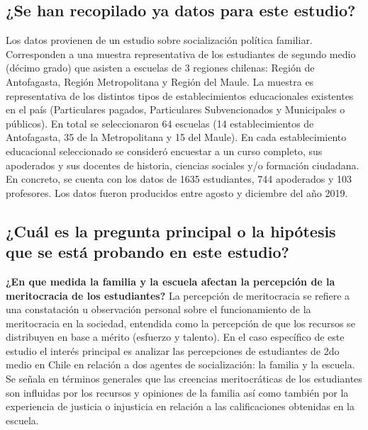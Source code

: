 \documentclass[
  12pt,
]{article}
\begin{document}
\pagebreak

\hypertarget{se-han-recopilado-ya-datos-para-este-estudio}{%
\subsection{¿Se han recopilado ya datos para este
estudio?}\label{se-han-recopilado-ya-datos-para-este-estudio}}

Los datos provienen de un estudio sobre socialización política familiar.
Corresponden a una muestra representativa de los estudiantes de segundo
medio (décimo grado) que asisten a escuelas de 3 regiones chilenas:
Región de Antofagasta, Región Metropolitana y Región del Maule. La
muestra es representativa de los distintos tipos de establecimientos
educacionales existentes en el país (Particulares pagados, Particulares
Subvencionados y Municipales o públicos). En total se seleccionaron 64
escuelas (14 establecimientos de Antofagasta, 35 de la Metropolitana y
15 del Maule). En cada establecimiento educacional seleccionado se
consideró encuestar a un curso completo, sus apoderados y sus docentes
de historia, ciencias sociales y/o formación ciudadana. En concreto, se
cuenta con los datos de 1635 estudiantes, 744 apoderados y 103
profesores. Los datos fueron producidos entre agosto y diciembre del año
2019.

\hypertarget{cuuxe1l-es-la-pregunta-principal-o-la-hipuxf3tesis-que-se-estuxe1-probando-en-este-estudio}{%
\subsection{¿Cuál es la pregunta principal o la hipótesis que se está
probando en este
estudio?}\label{cuuxe1l-es-la-pregunta-principal-o-la-hipuxf3tesis-que-se-estuxe1-probando-en-este-estudio}}

\textbf{¿En que medida la familia y la escuela afectan la percepción de
la meritocracia de los estudiantes?} La percepción de meritocracia se
refiere a una constatación u observación personal sobre el
funcionamiento de la meritocracia en la sociedad, entendida como la
percepción de que los recursos se distribuyen en base a mérito (esfuerzo
y talento). En el caso específico de este estudio el interés principal
es analizar las percepciones de estudiantes de 2do medio en Chile en
relación a dos agentes de socialización: la familia y la escuela. Se
señala en términos generales que las creencias meritocráticas de los
estudiantes son influidas por los recursos y opiniones de la familia así
como también por la experiencia de justicia o injusticia en relación a
las calificaciones obtenidas en la escuela.
\end{document}
